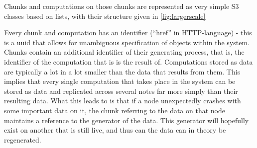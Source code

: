 Chunks and computations on those chunks are represented as very simple S3 classes based on lists, with their structure given in \cref{fig:largerscale}


Every chunk and computation has an identifier (``href'' in HTTP-language) - this is a uuid that allows for unambiguous specification of objects within the system.
Chunks contain an additional identifier of their generating process, that is, the identifier of the computation that is is the result of.
Computations stored as data are typically a lot in a lot smaller than the data that results from them.
This implies that every single computation that takes place in the system can be stored as data and replicated across several notes far more simply than their resulting data.
What this leads to is that if a node unexpectedly crashes with some important data on it, the chunk referring to the data on that node maintains a reference to the generator of the data.
This generator will hopefully exist on another that is still live, and thus can the data can in theory be regenerated.
